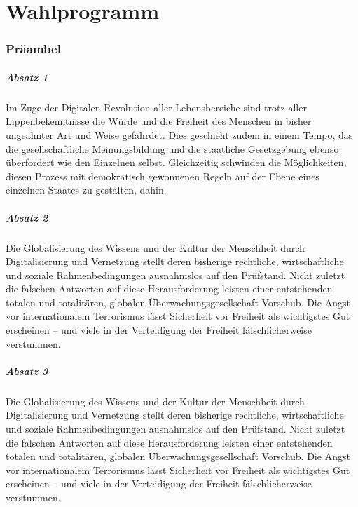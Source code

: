 \part{Wahlprogramm}
\section{Präambel}
\label{praeambel:unglow}
\subsubsection{Absatz 1}
\abstimmung
Im Zuge der Digitalen Revolution aller Lebensbereiche sind trotz aller Lippenbekenntnisse die Würde und die Freiheit des Menschen in bisher ungeahnter Art und Weise gefährdet. Dies geschieht zudem in einem Tempo, das die gesellschaftliche Meinungsbildung und die staatliche Gesetzgebung ebenso überfordert wie den Einzelnen selbst. Gleichzeitig schwinden die Möglichkeiten, diesen Prozess mit demokratisch gewonnenen Regeln auf der Ebene eines einzelnen Staates zu gestalten, dahin.
\subsubsection{Absatz 2}
\abstimmung
Die Globalisierung des Wissens und der Kultur der Menschheit durch Digitalisierung und Vernetzung stellt deren bisherige rechtliche, wirtschaftliche und soziale Rahmenbedingungen ausnahmslos auf den Prüfstand. Nicht zuletzt die falschen Antworten auf diese Herausforderung leisten einer entstehenden totalen und totalitären, globalen Überwachungsgesellschaft Vorschub. Die Angst vor internationalem Terrorismus lässt Sicherheit vor Freiheit als wichtigstes Gut erscheinen – und viele in der Verteidigung der Freiheit fälschlicherweise verstummen.
\subsubsection{Absatz 3}
\abstimmung
Die Globalisierung des Wissens und der Kultur der Menschheit durch Digitalisierung und Vernetzung stellt deren bisherige rechtliche, wirtschaftliche und soziale Rahmenbedingungen ausnahmslos auf den Prüfstand. Nicht zuletzt die falschen Antworten auf diese Herausforderung leisten einer entstehenden totalen und totalitären, globalen Überwachungsgesellschaft Vorschub. Die Angst vor internationalem Terrorismus lässt Sicherheit vor Freiheit als wichtigstes Gut erscheinen – und viele in der Verteidigung der Freiheit fälschlicherweise verstummen.
